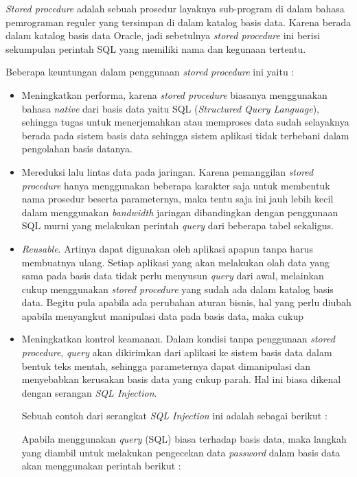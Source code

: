 \documentclass[pdftex,12pt, oneside]{article}
\begin{document}
\textit{Stored procedure} adalah sebuah prosedur layaknya sub-program di dalam bahasa pemrograman reguler yang tersimpan di dalam katalog basis data. Karena berada dalam katalog basis data Oracle, jadi sebetulnya \textit{stored procedure} ini berisi sekumpulan perintah SQL yang memiliki nama dan kegunaan tertentu.

Beberapa keuntungan dalam penggunaan \textit{stored procedure} ini yaitu :

\begin{itemize}
  \item Meningkatkan performa, karena \textit{stored procedure} biasanya menggunakan bahasa \textit{native} dari basis data yaitu SQL (\textit{Structured Query Language}), sehingga tugas untuk menerjemahkan atau memproses data sudah selayaknya berada pada sistem basis data sehingga sistem aplikasi tidak terbebani dalam pengolahan basis datanya.
  
  \item Mereduksi lalu lintas data pada jaringan. Karena pemanggilan \textit{stored procedure} hanya menggunakan beberapa karakter saja untuk membentuk nama prosedur beserta parameternya, maka tentu saja ini jauh lebih kecil dalam menggunakan \textit{bandwidth} jaringan dibandingkan dengan penggunaan SQL murni yang melakukan perintah \textit{query} dari beberapa tabel sekaligus.
  
  \item \textit{Reusable}. Artinya dapat digunakan oleh aplikasi apapun tanpa harus membuatnya ulang. Setiap aplikasi yang akan melakukan olah data yang sama pada basis data tidak perlu menyusun \textit{query} dari awal, melainkan cukup menggunakan \textit{stored procedure} yang sudah ada dalam katalog basis data. Begitu pula apabila ada perubahan aturan bisnis, hal yang perlu diubah apabila menyangkut manipulasi data pada basis data, maka cukup 
  
  \item Meningkatkan kontrol keamanan. Dalam kondisi tanpa penggunaan \textit{stored procedure}, \textit{query} akan dikirimkan dari aplikasi ke sistem basis data dalam bentuk teks mentah, sehingga parameternya dapat dimanipulasi dan menyebabkan kerusakan basis data yang cukup parah. Hal ini biasa dikenal dengan serangan \textit{SQL Injection}.
  
  Sebuah contoh dari serangkat \textit{SQL Injection} ini adalah sebagai berikut :
  
  Apabila menggunakan \textit{query} (SQL) biasa terhadap basis data, maka langkah yang diambil untuk melakukan pengecekan data \textit{password} dalam basis data akan menggunakan perintah berikut :
  

\end{itemize}
\end{document}

